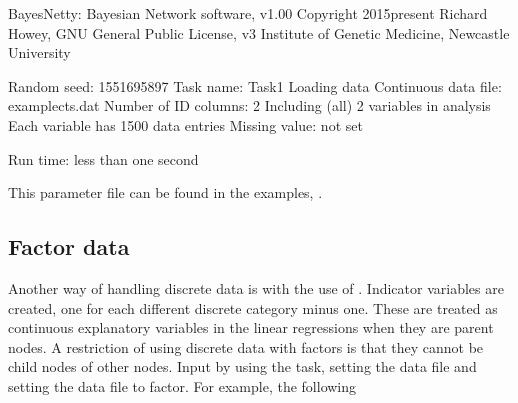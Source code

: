 \documentclass[letterpaper,10pt,english]{sphinxmanual}
\begin{document}
\begin{sphinxVerbatim}[commandchars=\\\{\}]
BayesNetty: Bayesian Network software, v1.00
\PYGZhy{}\PYGZhy{}\PYGZhy{}\PYGZhy{}\PYGZhy{}\PYGZhy{}\PYGZhy{}\PYGZhy{}\PYGZhy{}\PYGZhy{}\PYGZhy{}\PYGZhy{}\PYGZhy{}\PYGZhy{}\PYGZhy{}\PYGZhy{}\PYGZhy{}\PYGZhy{}\PYGZhy{}\PYGZhy{}\PYGZhy{}\PYGZhy{}\PYGZhy{}\PYGZhy{}\PYGZhy{}\PYGZhy{}\PYGZhy{}\PYGZhy{}\PYGZhy{}\PYGZhy{}\PYGZhy{}\PYGZhy{}\PYGZhy{}\PYGZhy{}\PYGZhy{}\PYGZhy{}\PYGZhy{}\PYGZhy{}\PYGZhy{}\PYGZhy{}\PYGZhy{}\PYGZhy{}\PYGZhy{}\PYGZhy{}\PYGZhy{}\PYGZhy{}\PYGZhy{}\PYGZhy{}\PYGZhy{}\PYGZhy{}
Copyright 2015\PYGZhy{}present Richard Howey, GNU General Public License, v3
Institute of Genetic Medicine, Newcastle University

Random seed: 1551695897
\PYGZhy{}\PYGZhy{}\PYGZhy{}\PYGZhy{}\PYGZhy{}\PYGZhy{}\PYGZhy{}\PYGZhy{}\PYGZhy{}\PYGZhy{}\PYGZhy{}\PYGZhy{}\PYGZhy{}\PYGZhy{}\PYGZhy{}\PYGZhy{}\PYGZhy{}\PYGZhy{}\PYGZhy{}\PYGZhy{}\PYGZhy{}\PYGZhy{}\PYGZhy{}\PYGZhy{}\PYGZhy{}\PYGZhy{}\PYGZhy{}\PYGZhy{}\PYGZhy{}\PYGZhy{}\PYGZhy{}\PYGZhy{}\PYGZhy{}\PYGZhy{}\PYGZhy{}\PYGZhy{}\PYGZhy{}\PYGZhy{}\PYGZhy{}\PYGZhy{}\PYGZhy{}\PYGZhy{}\PYGZhy{}\PYGZhy{}\PYGZhy{}\PYGZhy{}\PYGZhy{}\PYGZhy{}\PYGZhy{}\PYGZhy{}
Task name: Task\PYGZhy{}1
Loading data
Continuous data file: example\PYGZhy{}cts.dat
Number of ID columns: 2
Including (all) 2 variables in analysis
Each variable has 1500 data entries
Missing value: not set
\PYGZhy{}\PYGZhy{}\PYGZhy{}\PYGZhy{}\PYGZhy{}\PYGZhy{}\PYGZhy{}\PYGZhy{}\PYGZhy{}\PYGZhy{}\PYGZhy{}\PYGZhy{}\PYGZhy{}\PYGZhy{}\PYGZhy{}\PYGZhy{}\PYGZhy{}\PYGZhy{}\PYGZhy{}\PYGZhy{}\PYGZhy{}\PYGZhy{}\PYGZhy{}\PYGZhy{}\PYGZhy{}\PYGZhy{}\PYGZhy{}\PYGZhy{}\PYGZhy{}\PYGZhy{}\PYGZhy{}\PYGZhy{}\PYGZhy{}\PYGZhy{}\PYGZhy{}\PYGZhy{}\PYGZhy{}\PYGZhy{}\PYGZhy{}\PYGZhy{}\PYGZhy{}\PYGZhy{}\PYGZhy{}\PYGZhy{}\PYGZhy{}\PYGZhy{}\PYGZhy{}\PYGZhy{}\PYGZhy{}\PYGZhy{}

Run time: less than one second
\end{sphinxVerbatim}

\sphinxAtStartPar
This parameter file can be found  in the examples, .


\subsection{Factor data}
\label{\detokenize{input-data:factor-data}}\label{\detokenize{input-data:input-data-factor}}
\sphinxAtStartPar
Another way of handling discrete data is with the use of . Indicator variables are created, one for each different discrete category minus one.
These are treated as continuous explanatory variables in the linear regressions when they are parent nodes.
A restriction of using discrete data with factors is that they cannot be child nodes of other nodes. Input by using the  task, setting the data file and setting the data file to factor.
For example, the following
\end{document}
